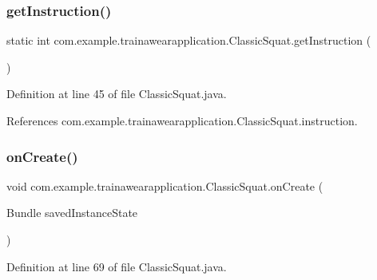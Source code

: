 \subsubsection{\texorpdfstring{getInstruction()}{getInstruction()}}
{\footnotesize\ttfamily static int com.\+example.\+trainawearapplication.\+Classic\+Squat.\+get\+Instruction (\begin{DoxyParamCaption}{ }\end{DoxyParamCaption})\hspace{0.3cm}{\ttfamily [static]}}



Definition at line 45 of file Classic\+Squat.\+java.


\begin{DoxyCode}{0}

\end{DoxyCode}


References com.\+example.\+trainawearapplication.\+Classic\+Squat.\+instruction.

\mbox{\label{classcom_1_1example_1_1trainawearapplication_1_1_classic_squat_afa5582341ba5a9609e4eb7d539741e6a}} 
\subsubsection{\texorpdfstring{onCreate()}{onCreate()}}
{\footnotesize\ttfamily void com.\+example.\+trainawearapplication.\+Classic\+Squat.\+on\+Create (\begin{DoxyParamCaption}\item[{Bundle}]{saved\+Instance\+State }\end{DoxyParamCaption})\hspace{0.3cm}{\ttfamily [protected]}}



Definition at line 69 of file Classic\+Squat.\+java.


